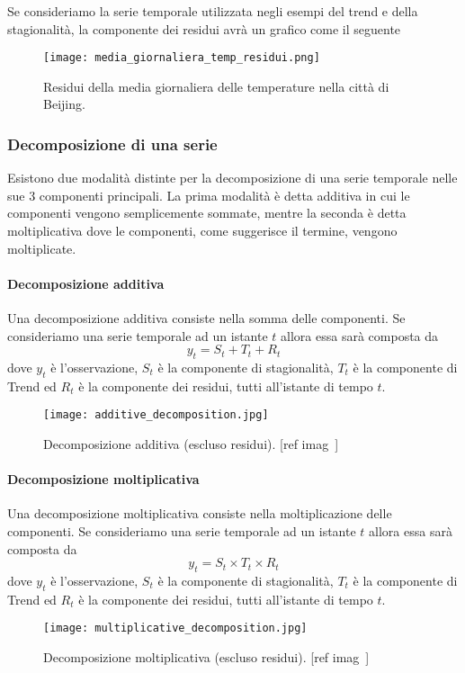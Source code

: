 \begin{esempio} 

    Se consideriamo la serie temporale utilizzata negli esempi del trend
    e della stagionalità, la componente dei residui avrà un grafico come il seguente

    \begin{figure}[H]
        \centering
        \texttt{[image: media\_giornaliera\_temp\_residui.png]}
        \caption{Residui della media giornaliera delle temperature nella città di Beijing.}
    \end{figure}

\end{esempio}


\subsubsection{Decomposizione di una serie}
Esistono due modalità distinte per la decomposizione di
una serie temporale nelle sue 3 componenti principali. La prima modalità è detta
additiva in cui le componenti vengono semplicemente sommate, mentre la seconda
è detta moltiplicativa dove le componenti, come suggerisce il termine, 
vengono moltiplicate.

\paragraph{Decomposizione additiva} 
Una decomposizione additiva consiste nella
somma delle componenti. Se consideriamo una serie temporale ad un 
istante $t$ allora essa sarà composta da
\[ y_t = S_t + T_t + R_t \]
dove $y_t$ è l'osservazione, $S_t$ è la componente di stagionalità, 
$T_t$ è la componente di Trend ed $R_t$ è la componente dei residui, tutti
all'istante di tempo $t$.
\begin{figure}[H]
    \centering
    \texttt{[image: additive\_decomposition.jpg]}
    \caption{Decomposizione additiva (escluso residui). [ref imag~\cite{md:seas_dec_imags}]}
    \label{fig:dec_serie_add}
\end{figure}


\paragraph{Decomposizione moltiplicativa} 
Una decomposizione moltiplicativa consiste nella
moltiplicazione delle componenti. Se consideriamo una serie temporale ad un 
istante $t$ allora essa sarà composta da
\[ y_t = S_t \times T_t \times R_t \]
dove $y_t$ è l'osservazione, $S_t$ è la componente di stagionalità, 
$T_t$ è la componente di Trend ed $R_t$ è la componente dei residui, tutti
all'istante di tempo $t$.
\begin{figure}[H]
    \centering
    \texttt{[image: multiplicative\_decomposition.jpg]}
    \caption{Decomposizione moltiplicativa (escluso residui). [ref imag~\cite{md:seas_dec_imags}]}
    \label{fig:dec_serie_mul}
\end{figure}

